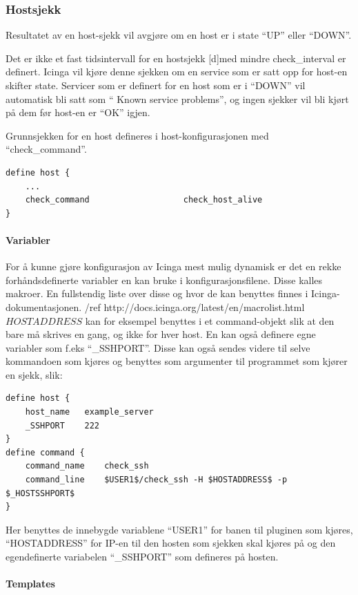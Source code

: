 \subsubsection{Hostsjekk}

Resultatet av en host-sjekk vil avgjøre om en host er i state “UP” eller “DOWN”. 

Det er ikke et fast tidsintervall for en hostsjekk [d]med mindre check\_interval er definert. Icinga vil kjøre denne sjekken om en service som er satt opp for host-en skifter state. Servicer som er definert for en host som er i “DOWN” vil automatisk bli satt som “ Known service problems”, og ingen sjekker vil bli kjørt på dem før host-en er “OK” igjen.

Grunnsjekken for en host defineres i host-konfigurasjonen med “check\_command”.

\begin{lstlisting}
define host {
	...
	check_command                   check_host_alive
}
\end{lstlisting}

\paragraph{Variabler}
For å kunne gjøre konfigurasjon av Icinga mest mulig dynamisk er det en rekke forhåndsdefinerte variabler en kan bruke i konfigurasjonsfilene. Disse kalles makroer. En fullstendig liste over disse og hvor de kan benyttes finnes i Icinga-dokumentasjonen. /ref http://docs.icinga.org/latest/en/macrolist.html $HOSTADDRESS$ kan for eksempel benyttes i et command-objekt slik at den bare må skrives en gang, og ikke for hver host. En kan også definere egne variabler som f.eks “\_SSHPORT”. Disse kan også sendes videre til selve kommandoen som kjøres og benyttes som argumenter til programmet som kjører en sjekk, slik:

\begin{lstlisting}
define host {
	host_name	example_server
	_SSHPORT	222
}
define command {
	command_name	check_ssh
	command_line	$USER1$/check_ssh -H $HOSTADDRESS$ -p $_HOSTSSHPORT$
}
\end{lstlisting}

Her benyttes de innebygde variablene “USER1” for banen til pluginen som kjøres, “HOSTADDRESS” for IP-en til den hosten som sjekken skal kjøres på og den egendefinerte variabelen “\_SSHPORT” som defineres på hosten.

\paragraph{Templates}

